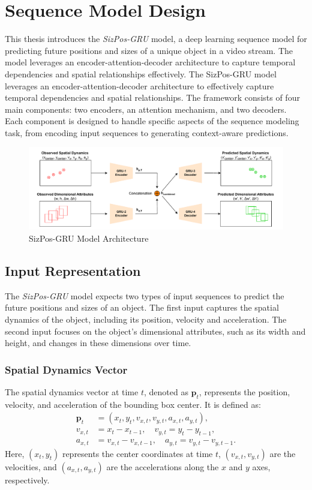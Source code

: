 \documentclass[12pt,oneside]{book} %
\begin{document}
\section{Sequence Model Design}
This thesis introduces the \textit{SizPos-GRU} model, a deep learning sequence
model for predicting future positions and sizes of a unique object in a video
stream. The model leverages an encoder-attention-decoder architecture to
capture temporal dependencies and spatial relationships effectively. The
SizPos-GRU model leverages an encoder-attention-decoder architecture to
effectively capture temporal dependencies and spatial relationships. The
framework consists of four main components: two encoders, an attention
mechanism, and two decoders. Each component is designed to handle specific
aspects of the sequence modeling task, from encoding input sequences to
generating context-aware predictions.

\begin{figure}[H]
    \centering
    \includegraphics[width=1\textwidth]{figures/GRUSizPos.drawio.pdf}
    \caption{SizPos-GRU Model Architecture}\label{fig:sizpos-gru}
\end{figure}

\newpage
\subsection{Input Representation}
\noindent The \textit{SizPos-GRU} model expects two types of input sequences to predict
the future positions and sizes of an object. The first input captures the
spatial dynamics of the object, including its position, velocity and
acceleration. The second input focuses on the object's dimensional attributes,
such as its width and height, and changes in these dimensions over time.

\subsubsection*{Spatial Dynamics Vector}
\noindent The spatial dynamics vector at time $t$, denoted as $\mathbf{p}_t$, represents the position, velocity, and acceleration of the bounding box center. It is defined as:
\begin{align}
    \mathbf{p}_t & = \left(x_t, y_t, v_{x,t}, v_{y,t}, a_{x,t}, a_{y,t}\right), \\
    v_{x,t}      & = x_t - x_{t-1}, \quad v_{y,t} = y_t - y_{t-1},              \\
    a_{x,t}      & = v_{x,t} - v_{x,t-1}, \quad a_{y,t} = v_{y,t} - v_{y,t-1}.
\end{align}
Here, $(x_t, y_t)$ represents the center coordinates at time $t$, $(v_{x,t}, v_{y,t})$ are the velocities, and $(a_{x,t}, a_{y,t})$ are the accelerations along the $x$ and $y$ axes, respectively.
\end{document}
